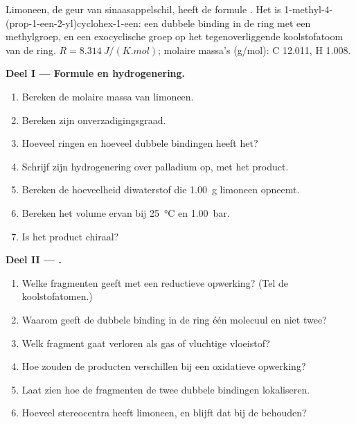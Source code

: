 \begin{problem}
\label{pb:b2:alkene-redox:1}
Limoneen, de geur van sinaasappelschil, heeft de formule . Het is
1-methyl-4-(prop-1-een-2-yl)cyclohex-1-een: een dubbele binding in de ring met een methylgroep, en een
exocyclische groep  op het tegenoverliggende koolstofatoom van de ring. $R =
\qty{8.314}{J/(K.mol)}$; molaire massa's (\unit{g/mol}): C 12.011, H 1.008.

\medskip
\noindent\textbf{Deel I --- Formule en hydrogenering.}
\begin{enumerate}
  \item Bereken de molaire massa van limoneen.
  \item Bereken zijn onverzadigingsgraad.
  \item Hoeveel ringen en hoeveel dubbele bindingen heeft het?
  \item Schrijf zijn hydrogenering over palladium op, met het product.
  \item Bereken de hoeveelheid diwaterstof die \qty{1.00}{g} limoneen opneemt.
  \item Bereken het volume ervan bij \qty{25}{\degreeCelsius} en \qty{1.00}{bar}.
  \item Is het product chiraal?
\end{enumerate}

\medskip
\noindent\textbf{Deel II --- .}
\begin{enumerate}[resume]
  \item Welke fragmenten geeft  met een reductieve opwerking? (Tel de koolstofatomen.)
  \item Waarom geeft de dubbele binding in de ring één molecuul en niet twee?
  \item Welk fragment gaat verloren als gas of vluchtige vloeistof?
  \item Hoe zouden de producten verschillen bij een oxidatieve opwerking?
  \item Laat zien hoe de fragmenten de twee dubbele bindingen lokaliseren.
  \item Hoeveel stereocentra heeft limoneen, en blijft dat bij de  behouden?
\end{enumerate}


\end{problem}
